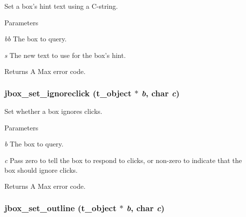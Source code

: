 Set a box's hint text using a C-\/string. 
\begin{DoxyParams}{Parameters}
\item[{\em bb}]The box to query. \item[{\em s}]The new text to use for the box's hint. \end{DoxyParams}
\begin{DoxyReturn}{Returns}
A Max error code. 
\end{DoxyReturn}
\hypertarget{group__jbox_ga35a6799e184e79e7df4552ed1b75f652}{
\subsubsection[{jbox\_\-set\_\-ignoreclick}]{ jbox\_\-set\_\-ignoreclick ({\bf t\_\-object} $\ast$ {\em b}, \/  char {\em c})}}
\label{group__jbox_ga35a6799e184e79e7df4552ed1b75f652}


Set whether a box ignores clicks. 
\begin{DoxyParams}{Parameters}
\item[{\em b}]The box to query. \item[{\em c}]Pass zero to tell the box to respond to clicks, or non-\/zero to indicate that the box should ignore clicks. \end{DoxyParams}
\begin{DoxyReturn}{Returns}
A Max error code. 
\end{DoxyReturn}
\hypertarget{group__jbox_ga77fc6d8afcf5b91b6b998803a66ca316}{
\subsubsection[{jbox\_\-set\_\-outline}]{ jbox\_\-set\_\-outline ({\bf t\_\-object} $\ast$ {\em b}, \/  char {\em c})}}
\label{group__jbox_ga77fc6d8afcf5b91b6b998803a66ca316}


